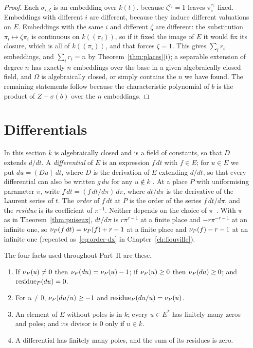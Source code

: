 \begin{proof}
Each $\sigma_{i,\zeta}$ is an embedding over $k(t)$, because $\zeta^{r_i} = 1$
leaves $\pi_i^{r_i}$ fixed. Embeddings with different $i$ are different,
because they induce different valuations on $E$. Embeddings with the same
$i$ and different $\zeta$ are different: the substitution $\pi_i \mapsto
\zeta \pi_i$ is continuous on $k((\pi_i))$, so if it fixed the image of $E$
it would fix its closure, which is all of $k((\pi_i))$, and that forces
$\zeta = 1$. This gives $\sum_i r_i$ embeddings, and $\sum_i r_i = n$ by
Theorem~\ref{thm:places}(i); a separable extension of degree $n$ has exactly
$n$ embeddings over the base in a given algebraically closed field, and
$\Omega$ is algebraically closed, or simply contains the $n$ we have found.
The remaining statements follow because the characteristic polynomial of $b$
is the product of $Z - \sigma(b)$ over the $n$ embeddings.
\end{proof}

\section{Differentials}\label{sec:ff-differentials}

In this section $k$ is algebraically closed and is a field of constants, so
that $D$ extends $d/dt$. A \emph{differential} of $E$ is
an expression $f\,dt$ with $f \in E$; for $u \in E$ we put $du = (Du)\,dt$,
where $D$ is the derivation of $E$ extending $d/dt$, so that every
differential can also be written $g\,du$ for any $u \notin k$
\cite[\S4.3]{stichtenoth2009}. At a place $P$ with uniformising parameter
$\pi$, write $f\,dt = (f\, dt/d\pi)\,d\pi$, where $dt/d\pi$ is the derivative
of the Laurent series of $t$. The \emph{order} of $f\,dt$ at $P$ is the order
of the series $f\,dt/d\pi$, and the \emph{residue} is its coefficient of
$\pi^{-1}$. Neither depends on the choice of
$\pi$~\cite[Theorem~4.3.2 and Remark~4.3.7]{stichtenoth2009}. With $\pi$ as
in Theorem~\ref{thm:puiseux}, $dt/d\pi$ is $r \pi^{r-1}$ at a finite place
and $-r \pi^{-r-1}$ at an infinite one, so $\nu_{P}(f\,dt) = \nu_{P}(f) + r -
1$ at a finite place and $\nu_{P}(f) - r - 1$ at an infinite one (repeated
as~\eqref{eq:order-dx} in Chapter~\ref{ch:liouville}).

The four facts used throughout Part~II are these.
\begin{enumerate}[label=\textup{(D\arabic*)}]
\item If $\nu_{P}(u) \ne 0$ then $\nu_{P}(du) = \nu_{P}(u) - 1$; if
  $\nu_{P}(u) \ge 0$ then $\nu_{P}(du) \ge 0$; and $\operatorname{residue}_P(du) = 0$.
\item For $u \ne 0$, $\nu_{P}(du/u) \ge -1$ and $\operatorname{residue}_P(du/u) =
  \nu_{P}(u)$.
\item An element of $E$ without poles is in $k$; every $u \in E^*$ has
  finitely many zeros and poles; and its divisor is $0$ only if $u \in k$.
\item A differential has finitely many poles, and the sum of its residues is
  zero.
\end{enumerate}

